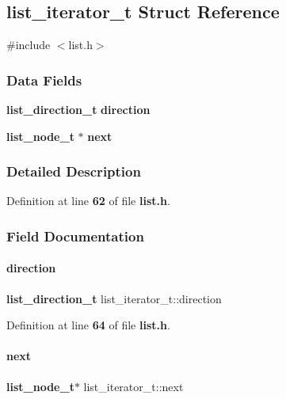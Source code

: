 \subsection{list\+\_\+iterator\+\_\+t Struct Reference}
\label{structlist__iterator__t}


{\ttfamily \#include $<$list.\+h$>$}

\subsubsection*{Data Fields}
\begin{DoxyCompactItemize}
\item 
\textbf{ list\+\_\+direction\+\_\+t} \textbf{ direction}
\item 
\textbf{ list\+\_\+node\+\_\+t} $\ast$ \textbf{ next}
\end{DoxyCompactItemize}


\subsubsection{Detailed Description}


Definition at line \textbf{ 62} of file \textbf{ list.\+h}.



\subsubsection{Field Documentation}
\mbox{\label{structlist__iterator__t_aa95ac6753d9a9e3671e4c21f3d05b32a}} 
\paragraph{direction}
{\footnotesize\ttfamily \textbf{ list\+\_\+direction\+\_\+t} list\+\_\+iterator\+\_\+t\+::direction}



Definition at line \textbf{ 64} of file \textbf{ list.\+h}.

\mbox{\label{structlist__iterator__t_adfc911fa0f601936c4a58c95a08737ee}} 
\paragraph{next}
{\footnotesize\ttfamily \textbf{ list\+\_\+node\+\_\+t}$\ast$ list\+\_\+iterator\+\_\+t\+::next}



